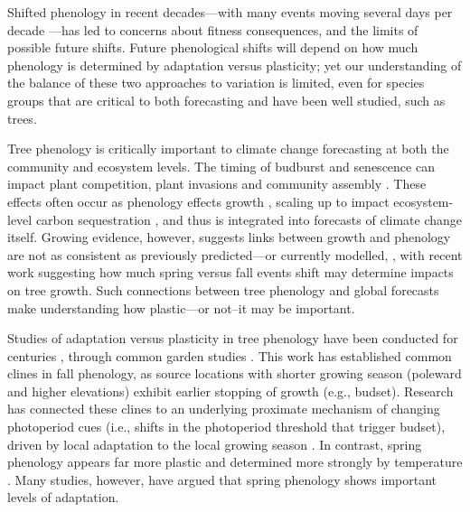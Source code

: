 \documentclass{article}
\begin{document}
Shifted phenology in recent decades---with many events moving several days per decade \citep{vita21,khar18,Menzel06}---has led to concerns about fitness consequences, and the limits of possible future shifts. Future phenological shifts will depend on how much phenology is determined by adaptation versus plasticity; yet our understanding of the balance of these two approaches to variation is limited, even for species groups that are critical to both forecasting and have been well studied, such as trees. 

Tree phenology is critically important to climate change forecasting at both the community and ecosystem levels. The timing of budburst and senescence can impact plant competition, plant invasions and community assembly \citep{fridley12}. These effects often occur as phenology effects growth \citep{myneni97}, scaling up to impact ecosystem-level carbon sequestration \citep{Barichivich12}, and thus is integrated into forecasts of climate change itself. Growing evidence, however, suggests links between growth and phenology are not as consistent as previously predicted---or currently modelled, 
, with recent work suggesting how much spring versus fall events shift may determine impacts on tree growth. %
Such connections between tree phenology and global forecasts make understanding how plastic---or not--it may be important. 

Studies of adaptation versus plasticity in tree phenology have been conducted for centuries \citep{Cleland:2007or}, through common garden studies \citep[i.e., studies---often for forestry purposes---where researchers grow trees of different geographical origins under the same environmental conditions to disentangle the effects of environmental and genetic variation on trees’ phenology and phenotype][]{AitkenBemmels16, Alberto13}. This work has established common clines in fall phenology, as source locations with shorter growing season (poleward and higher elevations) exhibit earlier stopping of growth (e.g., budset). Research has connected these clines to an underlying proximate mechanism of changing photoperiod cues (i.e., shifts in the photoperiod threshold that trigger budset), driven by local adaptation to the local growing season \citep{Alberto13,Savolainen07}. In contrast, spring phenology appears far more plastic \citep{AitkenBemmels16} and determined more strongly by temperature \citep{flynn18}. Many studies, however, have argued that spring phenology shows important levels of adaptation.  
\end{document}

